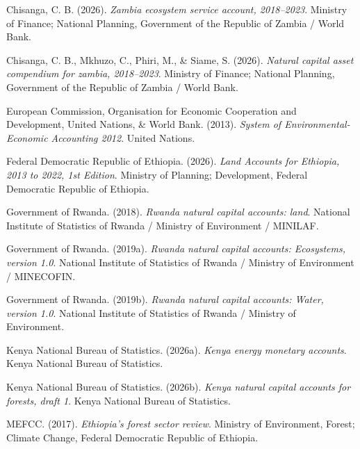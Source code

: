\documentclass[
  letterpaper,
  DIV=11,
  numbers=noendperiod]{scrartcl}
\newlength{\cslhangindent}
\newenvironment{CSLReferences}[2] %
 {\begin{list}{}{%
  \setlength{\itemindent}{0pt}
  \setlength{\leftmargin}{0pt}
  \setlength{\parsep}{0pt}
  \ifodd #1
   \setlength{\leftmargin}{\cslhangindent}
   \setlength{\itemindent}{-1\cslhangindent}
  \fi
  \setlength{\itemsep}{#2\baselineskip}}}
 {\end{list}}
\begin{document}
\protect{}\label{refs}
\begin{CSLReferences}{1}{0}
Chisanga, C. B. (2026). \emph{Zambia ecosystem service account,
2018--2023}. Ministry of Finance; National Planning, Government of the
Republic of Zambia / World Bank.

Chisanga, C. B., Mkhuzo, C., Phiri, M., \& Siame, S. (2026).
\emph{Natural capital asset compendium for zambia, 2018--2023}. Ministry
of Finance; National Planning, Government of the Republic of Zambia /
World Bank.

European Commission, Organisation for Economic Cooperation and
Development, United Nations, \& World Bank. (2013). \emph{System of
{Environmental}-{Economic} {Accounting} 2012}. United Nations.

Federal Democratic Republic of Ethiopia. (2026). \emph{Land {Accounts}
for {Ethiopia}, 2013 to 2022, 1st {Edition}}. Ministry of Planning;
Development, Federal Democratic Republic of Ethiopia.

Government of Rwanda. (2018). \emph{Rwanda natural capital accounts:
land}. National Institute of Statistics of Rwanda / Ministry of
Environment / MINILAF.

Government of Rwanda. (2019a). \emph{Rwanda natural capital accounts:
Ecosystems, version 1.0}. National Institute of Statistics of Rwanda /
Ministry of Environment / MINECOFIN.

Government of Rwanda. (2019b). \emph{Rwanda natural capital accounts:
Water, version 1.0}. National Institute of Statistics of Rwanda /
Ministry of Environment.

Kenya National Bureau of Statistics. (2026a). \emph{Kenya energy
monetary accounts}. Kenya National Bureau of Statistics.

Kenya National Bureau of Statistics. (2026b). \emph{Kenya natural
capital accounts for forests, draft 1}. Kenya National Bureau of
Statistics.

MEFCC. (2017). \emph{Ethiopia's forest sector review}. Ministry of
Environment, Forest; Climate Change, Federal Democratic Republic of
Ethiopia.


\end{CSLReferences}
\end{document}
